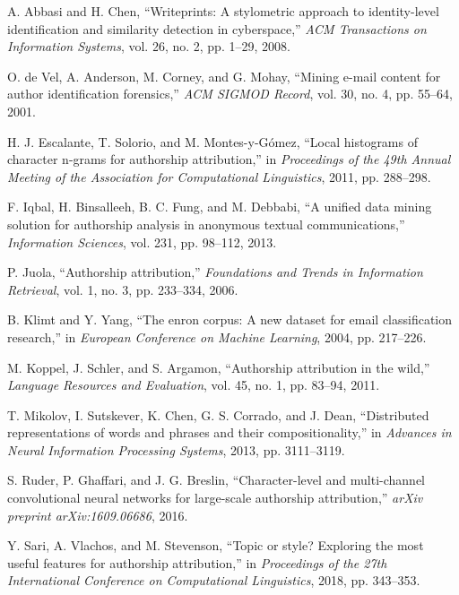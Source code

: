 \documentclass[11pt,a4paper]{article}
\begin{document}
\newpage

\begin{thebibliography}{99}

A. Abbasi and H. Chen, ``Writeprints: A stylometric approach to identity-level identification and similarity detection in cyberspace,'' \textit{ACM Transactions on Information Systems}, vol. 26, no. 2, pp. 1--29, 2008.

O. de Vel, A. Anderson, M. Corney, and G. Mohay, ``Mining e-mail content for author identification forensics,'' \textit{ACM SIGMOD Record}, vol. 30, no. 4, pp. 55--64, 2001.

H. J. Escalante, T. Solorio, and M. Montes-y-Gómez, ``Local histograms of character n-grams for authorship attribution,'' in \textit{Proceedings of the 49th Annual Meeting of the Association for Computational Linguistics}, 2011, pp. 288--298.

F. Iqbal, H. Binsalleeh, B. C. Fung, and M. Debbabi, ``A unified data mining solution for authorship analysis in anonymous textual communications,'' \textit{Information Sciences}, vol. 231, pp. 98--112, 2013.

P. Juola, ``Authorship attribution,'' \textit{Foundations and Trends in Information Retrieval}, vol. 1, no. 3, pp. 233--334, 2006.

B. Klimt and Y. Yang, ``The enron corpus: A new dataset for email classification research,'' in \textit{European Conference on Machine Learning}, 2004, pp. 217--226.

M. Koppel, J. Schler, and S. Argamon, ``Authorship attribution in the wild,'' \textit{Language Resources and Evaluation}, vol. 45, no. 1, pp. 83--94, 2011.

T. Mikolov, I. Sutskever, K. Chen, G. S. Corrado, and J. Dean, ``Distributed representations of words and phrases and their compositionality,'' in \textit{Advances in Neural Information Processing Systems}, 2013, pp. 3111--3119.

S. Ruder, P. Ghaffari, and J. G. Breslin, ``Character-level and multi-channel convolutional neural networks for large-scale authorship attribution,'' \textit{arXiv preprint arXiv:1609.06686}, 2016.

Y. Sari, A. Vlachos, and M. Stevenson, ``Topic or style? Exploring the most useful features for authorship attribution,'' in \textit{Proceedings of the 27th International Conference on Computational Linguistics}, 2018, pp. 343--353.


\end{thebibliography}
\end{document}
